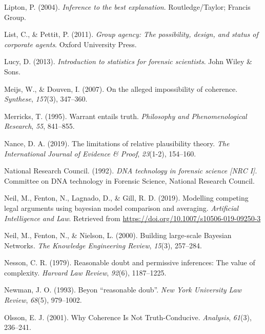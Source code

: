 \documentclass[11pt,dvipsnames,enabledeprecatedfontcommands]{scrartcl}
\begin{document}
\leavevmode\hypertarget{ref-Lipton2004-LIPITT}{}%
Lipton, P. (2004). \emph{Inference to the best explanation}.
Routledge/Taylor; Francis Group.

\leavevmode\hypertarget{ref-List2011Group}{}%
List, C., \& Pettit, P. (2011). \emph{Group agency: The possibility,
design, and status of corporate agents}. Oxford University Press.

\leavevmode\hypertarget{ref-lucy2013introduction}{}%
Lucy, D. (2013). \emph{Introduction to statistics for forensic
scientists}. John Wiley \& Sons.

\leavevmode\hypertarget{ref-meijs2007}{}%
Meijs, W., \& Douven, I. (2007). On the alleged impossibility of
coherence. \emph{Synthese}, \emph{157}(3), 347--360.

\leavevmode\hypertarget{ref-Merricks1995}{}%
Merricks, T. (1995). Warrant entails truth. \emph{Philosophy and
Phenomenological Research}, \emph{55}, 841--855.

\leavevmode\hypertarget{ref-nance2019LimitationsRelativePlausibility}{}%
Nance, D. A. (2019). The limitations of relative plausibility theory.
\emph{The International Journal of Evidence \& Proof}, \emph{23}(1-2),
154--160.

\leavevmode\hypertarget{ref-NRCI1992}{}%
National Research Council. (1992). \emph{DNA technology in forensic
science \textup{{[}NRC I{]}}}. Committee on DNA technology in Forensic
Science, National Research Council.

\leavevmode\hypertarget{ref-Fenton2019Modelling}{}%
Neil, M., Fenton, N., Lagnado, D., \& Gill, R. D. (2019). Modelling
competing legal arguments using bayesian model comparison and averaging.
\emph{Artificial Intelligence and Law}. Retrieved from
\url{https://doi.org/10.1007/s10506-019-09250-3}

\leavevmode\hypertarget{ref-neil2000BuildingLargescaleBayesian}{}%
Neil, M., Fenton, N., \& Nielson, L. (2000). Building large-scale
Bayesian Networks. \emph{The Knowledge Engineering Review},
\emph{15}(3), 257--284.

\leavevmode\hypertarget{ref-Nesson1979Reasonable-doub}{}%
Nesson, C. R. (1979). Reasonable doubt and permissive inferences: The
value of complexity. \emph{Harvard Law Review}, \emph{92}(6),
1187--1225.

\leavevmode\hypertarget{ref-newman1993}{}%
Newman, J. O. (1993). Beyon ``reasonable doub''. \emph{New York
University Law Review}, \emph{68}(5), 979--1002.

\leavevmode\hypertarget{ref-olsson2001}{}%
Olsson, E. J. (2001). Why Coherence Is Not Truth-Conducive.
\emph{Analysis}, \emph{61}(3), 236--241.
\end{document}
